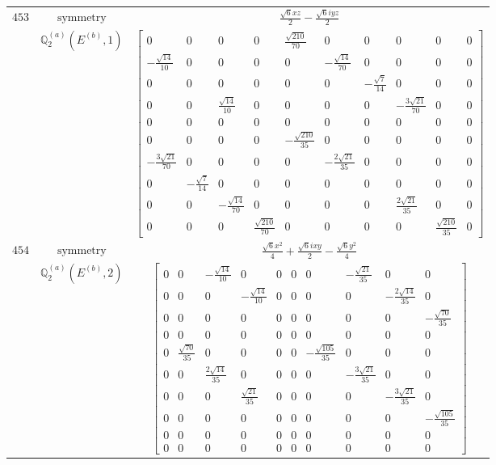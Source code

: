 \documentclass[fleqn,8pt,landscape]{jsarticle}
\begin{document}
\begin{longtable}{ccc}
$ 453 $ & $ \text{symmetry} $ & $ \frac{\sqrt{6} x z}{2} - \frac{\sqrt{6} i y z}{2} $ \\
$  $ & $ \mathbb{Q}_{2}^{(a)}(E^{(b)},1) $ & $ \begin{bmatrix} 0 & 0 & 0 & 0 & \frac{\sqrt{210}}{70} & 0 & 0 & 0 & 0 & 0 \\ - \frac{\sqrt{14}}{10} & 0 & 0 & 0 & 0 & - \frac{\sqrt{14}}{70} & 0 & 0 & 0 & 0 \\ 0 & 0 & 0 & 0 & 0 & 0 & - \frac{\sqrt{7}}{14} & 0 & 0 & 0 \\ 0 & 0 & \frac{\sqrt{14}}{10} & 0 & 0 & 0 & 0 & - \frac{3 \sqrt{21}}{70} & 0 & 0 \\ 0 & 0 & 0 & 0 & 0 & 0 & 0 & 0 & 0 & 0 \\ 0 & 0 & 0 & 0 & - \frac{\sqrt{210}}{35} & 0 & 0 & 0 & 0 & 0 \\ - \frac{3 \sqrt{21}}{70} & 0 & 0 & 0 & 0 & - \frac{2 \sqrt{21}}{35} & 0 & 0 & 0 & 0 \\ 0 & - \frac{\sqrt{7}}{14} & 0 & 0 & 0 & 0 & 0 & 0 & 0 & 0 \\ 0 & 0 & - \frac{\sqrt{14}}{70} & 0 & 0 & 0 & 0 & \frac{2 \sqrt{21}}{35} & 0 & 0 \\ 0 & 0 & 0 & \frac{\sqrt{210}}{70} & 0 & 0 & 0 & 0 & \frac{\sqrt{210}}{35} & 0 \end{bmatrix} $ \\ \hline
$ 454 $ & $ \text{symmetry} $ & $ \frac{\sqrt{6} x^{2}}{4} + \frac{\sqrt{6} i x y}{2} - \frac{\sqrt{6} y^{2}}{4} $ \\
$  $ & $ \mathbb{Q}_{2}^{(a)}(E^{(b)},2) $ & $ \begin{bmatrix} 0 & 0 & - \frac{\sqrt{14}}{10} & 0 & 0 & 0 & 0 & - \frac{\sqrt{21}}{35} & 0 & 0 \\ 0 & 0 & 0 & - \frac{\sqrt{14}}{10} & 0 & 0 & 0 & 0 & - \frac{2 \sqrt{14}}{35} & 0 \\ 0 & 0 & 0 & 0 & 0 & 0 & 0 & 0 & 0 & - \frac{\sqrt{70}}{35} \\ 0 & 0 & 0 & 0 & 0 & 0 & 0 & 0 & 0 & 0 \\ 0 & \frac{\sqrt{70}}{35} & 0 & 0 & 0 & 0 & - \frac{\sqrt{105}}{35} & 0 & 0 & 0 \\ 0 & 0 & \frac{2 \sqrt{14}}{35} & 0 & 0 & 0 & 0 & - \frac{3 \sqrt{21}}{35} & 0 & 0 \\ 0 & 0 & 0 & \frac{\sqrt{21}}{35} & 0 & 0 & 0 & 0 & - \frac{3 \sqrt{21}}{35} & 0 \\ 0 & 0 & 0 & 0 & 0 & 0 & 0 & 0 & 0 & - \frac{\sqrt{105}}{35} \\ 0 & 0 & 0 & 0 & 0 & 0 & 0 & 0 & 0 & 0 \\ 0 & 0 & 0 & 0 & 0 & 0 & 0 & 0 & 0 & 0 \end{bmatrix} $ \\ \hline

\end{longtable}
\end{document}
